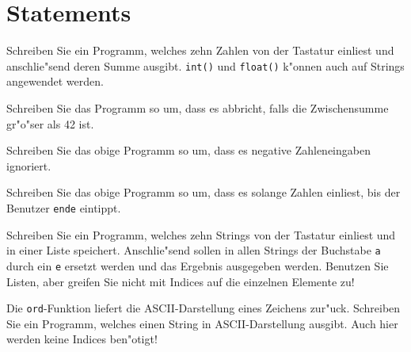 \section*{Statements}
\begin{aufgabe}
Schreiben Sie ein Programm, welches zehn Zahlen von der Tastatur einliest und anschlie"send deren Summe ausgibt. \hinweis \lstinline{int()} und \lstinline{float()} k"onnen auch auf Strings angewendet werden.
\begin{teilaufgabe}
Schreiben Sie das Programm so um, dass es abbricht, falls die Zwischensumme gr"o"ser als 42 ist.
\end{teilaufgabe}
\begin{teilaufgabe}
Schreiben Sie das obige Programm so um, dass es negative Zahleneingaben ignoriert.\end{teilaufgabe}
\begin{teilaufgabe}
Schreiben Sie das obige Programm so um, dass es solange Zahlen einliest, bis der Benutzer \texttt{ende} eintippt.
\end{teilaufgabe}
\end{aufgabe}

\begin{aufgabe}
Schreiben Sie ein Programm, welches zehn Strings von der Tastatur einliest und in einer Liste speichert. Anschlie"send sollen in allen Strings der Buchstabe \texttt{a} durch ein \texttt{e} ersetzt werden und das Ergebnis ausgegeben werden. \hinweis Benutzen Sie Listen, aber greifen Sie nicht mit Indices auf die einzelnen Elemente zu!
\end{aufgabe}

\begin{aufgabe}
Die \lstinline{ord}-Funktion liefert die ASCII-Darstellung eines Zeichens zur"uck. Schreiben Sie ein Programm, welches einen String in ASCII-Darstellung ausgibt. \hinweis Auch hier werden keine Indices ben"otigt!
\end{aufgabe}



